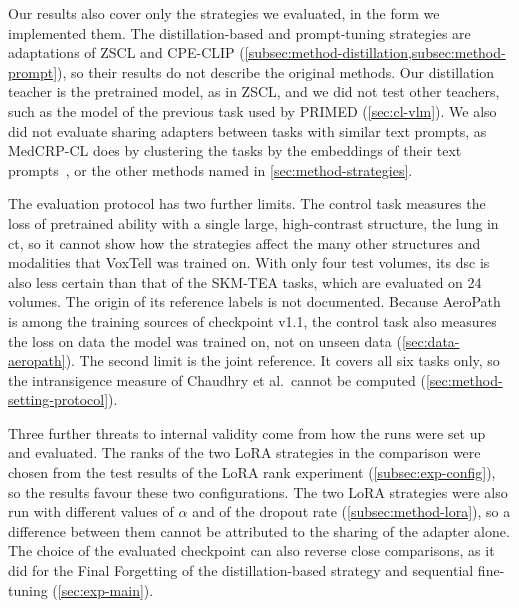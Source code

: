 Our results also cover only the strategies we evaluated, in the form we implemented them.
The distillation-based and prompt-tuning strategies are adaptations of ZSCL and CPE-CLIP (\cref{subsec:method-distillation,subsec:method-prompt}), so their results do not describe the original methods.
Our distillation teacher is the pretrained model, as in ZSCL, and we did not test other teachers, such as the model of the previous task used by PRIMED (\cref{sec:cl-vlm}).
We also did not evaluate sharing adapters between tasks with similar text prompts, as MedCRP-CL does by clustering the tasks by the embeddings of their text prompts~\cite{gao2026medcrpcl}, or the other methods named in \cref{sec:method-strategies}.

The evaluation protocol has two further limits.
The control task measures the loss of pretrained ability with a single large, high-contrast structure, the lung in \gls{ct}, so it cannot show how the strategies affect the many other structures and modalities that VoxTell was trained on.
With only four test volumes, its \gls{dsc} is also less certain than that of the SKM-TEA tasks, which are evaluated on 24 volumes.
The origin of its reference labels is not documented.
Because AeroPath is among the training sources of checkpoint v1.1, the control task also measures the loss on data the model was trained on, not on unseen data (\cref{sec:data-aeropath}).
The second limit is the joint reference.
It covers all six tasks only, so the intransigence measure of Chaudhry et al.\ cannot be computed (\cref{sec:method-setting-protocol}).

Three further threats to internal validity come from how the runs were set up and evaluated.
The ranks of the two LoRA strategies in the comparison were chosen from the test results of the LoRA rank experiment (\cref{subsec:exp-config}), so the results favour these two configurations.
The two LoRA strategies were also run with different values of $\alpha$ and of the dropout rate (\cref{subsec:method-lora}), so a difference between them cannot be attributed to the sharing of the adapter alone.
The choice of the evaluated checkpoint can also reverse close comparisons, as it did for the Final Forgetting of the distillation-based strategy and sequential fine-tuning (\cref{sec:exp-main}).

